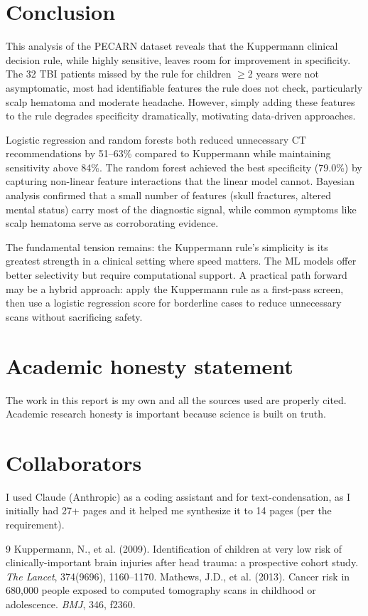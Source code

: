 \documentclass[11pt,letterpaper]{article}
\begin{document}
\section{Conclusion}\label{conclusion}

This analysis of the PECARN dataset reveals that the Kuppermann clinical decision rule, while highly sensitive, leaves room for improvement in specificity. The 32 TBI patients missed by the rule for children $\geq$2 years were not asymptomatic, most had identifiable features the rule does not check, particularly scalp hematoma and moderate headache. However, simply adding these features to the rule degrades specificity dramatically, motivating data-driven approaches.

Logistic regression and random forests both reduced unnecessary CT recommendations by 51--63\% compared to Kuppermann while maintaining sensitivity above 84\%. The random forest achieved the best specificity (79.0\%) by capturing non-linear feature interactions that the linear model cannot. Bayesian analysis confirmed that a small number of features (skull fractures, altered mental status) carry most of the diagnostic signal, while common symptoms like scalp hematoma serve as corroborating evidence.

The fundamental tension remains: the Kuppermann rule's simplicity is its greatest strength in a clinical setting where speed matters. The ML models offer better selectivity but require computational support. A practical path forward may be a hybrid approach: apply the Kuppermann rule as a first-pass screen, then use a logistic regression score for borderline cases to reduce unnecessary scans without sacrificing safety.


\section{Academic honesty statement}\label{academic-honesty-statement}

The work in this report is my own and all the sources used are properly cited. Academic research honesty is important because science is built on truth.

\section{Collaborators}\label{collaborators}
I used Claude (Anthropic) as a coding assistant and for text-condensation, as I initially had 27+ pages and it helped me synthesize it to 14 pages (per the requirement).



\begin{thebibliography}{9}
Kuppermann, N., et al. (2009). Identification of children at very low risk of clinically-important brain injuries after head trauma: a prospective cohort study. \textit{The Lancet}, 374(9696), 1160--1170.
Mathews, J.D., et al. (2013). Cancer risk in 680,000 people exposed to computed tomography scans in childhood or adolescence. \textit{BMJ}, 346, f2360.
\end{thebibliography}
\end{document}
